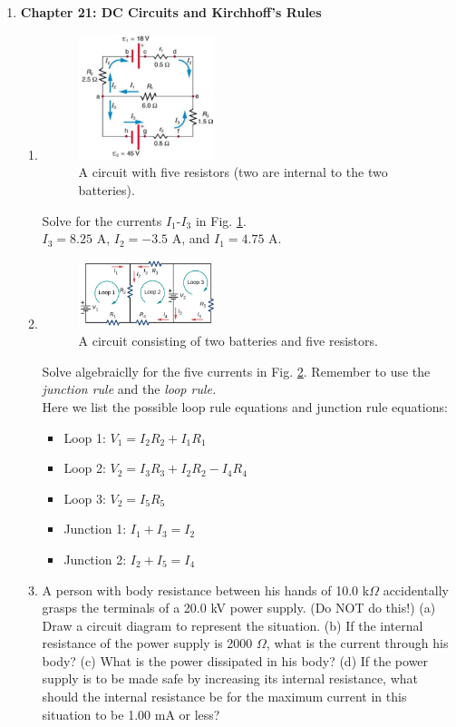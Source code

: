 \documentclass[10pt]{article}
\begin{document}
\begin{enumerate}
\item \textbf{Chapter 21: DC Circuits and Kirchhoff's Rules}
\begin{enumerate}
\item 
\begin{figure}[ht]
\centering
\includegraphics[width=0.4\textwidth]{circuit1.png}
\caption{\label{fig:circuit1} A circuit with five resistors (two are internal to the two batteries).}
\end{figure}
Solve for the currents $I_1$-$I_3$ in Fig. \ref{fig:circuit1}. \\ $I_3 = 8.25$ A, $I_2 = -3.5$ A, and $I_1 = 4.75$ A.
\item 
\begin{figure}[ht]
\centering
\includegraphics[width=0.4\textwidth]{circuit2.png}
\caption{\label{fig:circuit2} A circuit consisting of two batteries and five resistors.}
\end{figure}
Solve algebraiclly for the five currents in Fig. \ref{fig:circuit2}.  Remember to use the \textit{junction rule} and the \textit{loop rule.} \\ Here we list the possible loop rule equations and junction rule equations:
\begin{itemize}
\item Loop 1: $V_1 = I_2 R_2 + I_1 R_1$
\item Loop 2: $V_2 = I_3 R_3 + I_2 R_2 - I_4 R_4$
\item Loop 3: $V_2 = I_5 R_5$
\item Junction 1: $I_1 + I_3 = I_2$
\item Junction 2: $I_2 + I_5 = I_4$
\end{itemize}
\item A person with body resistance between his hands of 10.0 k$\Omega$ accidentally grasps the terminals of a 20.0 kV power supply. (Do NOT do this!) (a) Draw a circuit diagram to represent the situation. (b) If the internal resistance of the power supply is 2000 $\Omega$, what is the current through his body? (c) What is the power dissipated in his body? (d) If the power supply is to be made safe by increasing its internal resistance, what should the internal resistance be for the maximum current in this situation to be 1.00 mA or less? \\ \\

\end{enumerate}
\end{enumerate}
\end{document}
